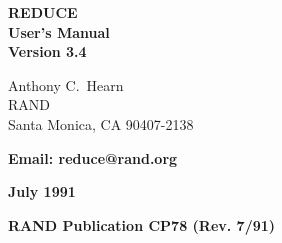 

\parindent 0pt

\parskip 6pt

\raggedbottom

\newlength{\reduceboxwidth}
\setlength{\reduceboxwidth}{4in}

\newlength{\redboxwidth}
\setlength{\redboxwidth}{3.5in}

\newlength{\rboxwidth}
\setlength{\rboxwidth}{2.6in}

\newcommand{\REDUCE}{REDUCE}
\newcommand{\RLISP}{RLISP}
\newcommand{\ttindex}[1]{\index{#1@{\tt #1}}}
\newcommand{\COMPATNOTE}{{\em Compatibility Note:\ }}

\setlength{\topsep}{0.5\baselineskip}  %
\setlength{\itemsep}{\topsep}
\setlength{\abovedisplayskip}{\topsep}  %
\setlength{\belowdisplayskip}{\topsep}

\pagestyle{headings}

\makeindex


\pagestyle{empty}
\begin{titlepage}
\vspace*{\fill}
\begin{center}

{\Huge\bf {\REDUCE}} \\[0.2cm]
{\LARGE\bf User's Manual\vspace{0.4cm} \\
  Version 3.4}

\vspace{0.5in}\large\bf

Anthony C.\ Hearn \\
RAND \\
Santa Monica, CA 90407-2138

\vspace{0.1in}

\bf Email: reduce@rand.org

\vspace{0.5in}

\large\bf July 1991

\vspace*{2.5in}

\bf RAND Publication CP78 (Rev. 7/91)
\end{center}
\end{titlepage}

